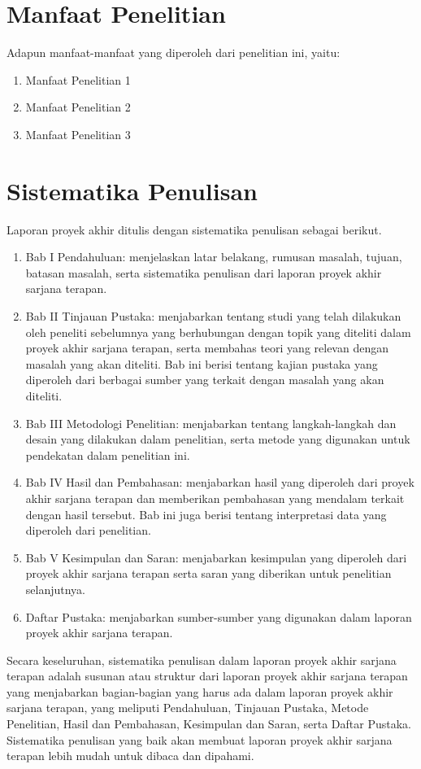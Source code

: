 \section{Manfaat Penelitian}
Adapun manfaat-manfaat yang diperoleh dari penelitian ini, yaitu:
\begin{enumerate}
    \item Manfaat Penelitian 1
    \item Manfaat Penelitian 2
    \item Manfaat Penelitian 3
\end{enumerate}

\section{Sistematika Penulisan}
Laporan proyek akhir ditulis dengan sistematika penulisan sebagai berikut.
\begin{enumerate}
    \item Bab I Pendahuluan: menjelaskan latar belakang, rumusan masalah, tujuan, batasan masalah, serta sistematika penulisan dari laporan proyek akhir sarjana terapan.
    \item Bab II Tinjauan Pustaka: menjabarkan tentang studi yang telah dilakukan oleh peneliti sebelumnya yang berhubungan dengan topik yang diteliti dalam proyek akhir sarjana terapan, serta membahas teori yang relevan dengan masalah yang akan diteliti. Bab ini berisi tentang kajian pustaka yang diperoleh dari berbagai sumber yang terkait dengan masalah yang akan diteliti.
    \item Bab III Metodologi Penelitian: menjabarkan tentang langkah-langkah dan desain yang dilakukan dalam penelitian, serta metode yang digunakan untuk pendekatan dalam penelitian ini.
    \item Bab IV Hasil dan Pembahasan: menjabarkan hasil yang diperoleh dari proyek akhir sarjana terapan dan memberikan pembahasan yang mendalam terkait dengan hasil tersebut. Bab ini juga berisi tentang interpretasi data yang diperoleh dari penelitian.
    \item Bab V Kesimpulan dan Saran: menjabarkan kesimpulan yang diperoleh dari proyek akhir sarjana terapan serta saran yang diberikan untuk penelitian selanjutnya.
    \item Daftar Pustaka: menjabarkan sumber-sumber yang digunakan dalam laporan proyek akhir sarjana terapan.
\end{enumerate}

Secara keseluruhan, sistematika penulisan dalam laporan proyek akhir sarjana terapan adalah susunan atau struktur dari laporan proyek akhir sarjana terapan yang menjabarkan bagian-bagian yang harus ada dalam laporan proyek akhir sarjana terapan, yang meliputi Pendahuluan, Tinjauan Pustaka, Metode Penelitian, Hasil dan Pembahasan, Kesimpulan dan Saran, serta Daftar Pustaka. Sistematika penulisan yang baik akan membuat laporan proyek akhir sarjana terapan lebih mudah untuk dibaca dan dipahami.